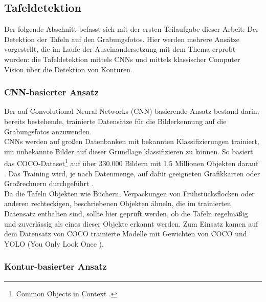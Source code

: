 \subsection{Tafeldetektion}

Der folgende Abschnitt befasst sich mit der ersten Teilaufgabe dieser Arbeit: Der Detektion der Tafeln auf den Grabungsfotos. Hier werden mehrere Ansätze vorgestellt, die im Laufe der Auseinandersetzung mit dem Thema erprobt wurden: die Tafeldetektion mittels CNNs und mittels klassischer Computer Vision über die Detektion von Konturen.

\subsubsection{CNN-basierter Ansatz}

Der auf Convolutional Neural Networks (CNN) basierende Ansatz bestand darin, bereits bestehende, trainierte Datensätze für die Bilderkennung auf die Grabungsfotos anzuwenden.\\
CNNs werden auf großen Datenbanken mit bekannten Klassifizierungen trainiert, um unbekannte Bilder auf dieser Grundlage klassifizieren zu können. So basiert das COCO-Dataset\footnote{Common Objects in Context \cite{coco}.} auf über 330.000 Bildern mit 1,5 Millionen Objekten darauf \cite{coco}. Das Training wird, je nach Datenmenge, auf dafür geeigneten Grafikkarten oder Großrechnern durchgeführt \cite{ki}.\\
Da die  Tafeln Objekten wie Büchern, Verpackungen von Frühstücksflocken oder anderen rechteckigen, beschriebenen Objekten ähneln, die im trainierten Datensatz enthalten sind, sollte hier geprüft werden, ob die Tafeln regelmäßig und zuverlässig als eines dieser Objekte erkannt werden.
Zum Einsatz kamen auf dem Datensatz von COCO trainierte Modelle mit Gewichten von COCO und YOLO (You Only Look Once \cite{yolo}{} \cite{yolo2}).


\subsubsection{Kontur-basierter Ansatz}

